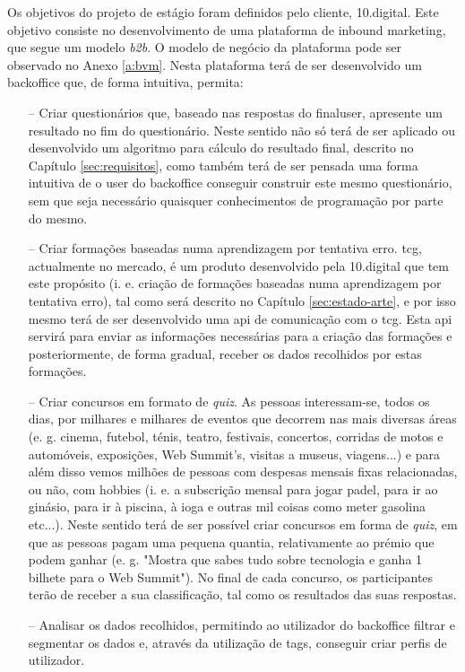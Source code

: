 Os objetivos do projeto de estágio foram definidos pelo cliente, 10.digital. Este objetivo consiste no desenvolvimento de uma plataforma de inbound marketing, que segue um modelo \textit{\gls{b2b}}. O modelo de negócio da plataforma pode ser observado no Anexo \ref{a:bvm}. Nesta plataforma terá de ser desenvolvido um \gls{backoffice} que, de forma intuitiva, permita:
\begin{itemize}
	\item[--] Criar questionários que, baseado nas respostas do \gls{finaluser}, apresente um resultado no fim do questionário. Neste sentido não só terá de ser aplicado ou desenvolvido um algoritmo para cálculo do resultado final, descrito no Capítulo \ref{sec:requisitos}, como também terá de ser pensada uma forma intuitiva de o \gls{user} do \gls{backoffice} conseguir construir este mesmo questionário, sem que seja necessário quaisquer conhecimentos de programação por parte do mesmo.
	\item[--] Criar formações baseadas numa aprendizagem por tentativa erro. \acrfull{tcg}\cite{tcg}, actualmente no mercado, é um produto desenvolvido pela 10.digital que tem este propósito (i. e. criação de formações baseadas numa aprendizagem por tentativa erro), tal como será descrito no Capítulo \ref{sec:estado-arte}, e por isso mesmo terá de ser desenvolvido uma \acrshort{api} de comunicação com o \acrshort{tcg}. Esta \acrshort{api} servirá para enviar as informações necessárias para a criação das formações e posteriormente, de forma gradual, receber os dados recolhidos por estas formações. 
	\item[--] Criar concursos em formato de \textit{quiz}. As pessoas interessam-se, todos os dias, por milhares e milhares de eventos que decorrem nas mais diversas áreas (e. g. 	cinema, futebol, ténis, teatro, festivais, concertos, corridas de motos e automóveis, exposições, Web Summit's\cite{websummit}, visitas a museus, viagens...) e para além disso
	vemos milhões de pessoas com despesas mensais fixas relacionadas, ou não, com hobbies (i. e. a subscrição mensal para jogar padel, para ir ao ginásio, para ir à piscina, à ioga e outras mil coisas como meter gasolina etc...). Neste sentido terá de ser possível criar concursos em forma de \textit{quiz}, em que as pessoas pagam uma pequena quantia, relativamente ao prémio que podem ganhar (e. g. "Mostra que sabes tudo sobre tecnologia e ganha 1 bilhete para o Web Summit"). No final de cada concurso, os participantes terão de receber a sua classificação, tal como os resultados das suas respostas.
	\item[--] Analisar os dados recolhidos, permitindo ao utilizador do \gls{backoffice} filtrar e segmentar os dados e, através da utilização de \gls{tags}, conseguir criar perfis de utilizador.
\end{itemize}



